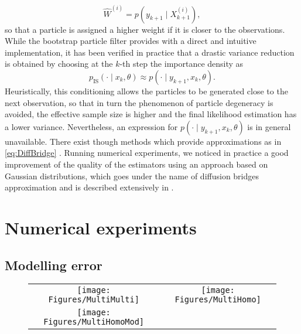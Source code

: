\documentclass[10pt]{article}
\begin{document}
\begin{equation}
	\widehat W^{(i)} = p(y_{k+1} \mid X^{(i)}_{k+1}),
\end{equation}
so that a particle is assigned a higher weight if it is closer to the observations. While the bootstrap particle filter provides with a direct and intuitive implementation, it has been verified in practice that a drastic variance reduction is obtained by choosing at the $k$-th step the importance density as
\begin{equation}\label{eq:DiffBridge}
	p_{\mathrm{IS}}(\cdot \mid x_k, \theta) \approx p(\cdot \mid y_{k+1}, x_k, \theta).
\end{equation}
Heuristically, this conditioning allows the particles to be generated close to the next observation, so that in turn the phenomenon of particle degeneracy is avoided, the effective sample size is higher and the final likelihood estimation has a lower variance. Nevertheless, an expression for $p(\cdot \mid y_{k+1}, x_k, \theta)$ is in general unavailable. There exist though methods which provide approximations as in \eqref{eq:DiffBridge} \cite{GoW10, GoW11}. Running numerical experiments, we noticed in practice a good improvement of the quality of the estimators using an approach based on Gaussian distributions, which goes under the name of diffusion bridges approximation and is described extensively in \cite{GoW11}.


\section{Numerical experiments}

\subsection{Modelling error}

\begin{figure}[t]
	\centering
	\begin{tabular}{cc}
		\texttt{[image: Figures/MultiMulti]} & \texttt{[image: Figures/MultiHomo]} \\
		\texttt{[image: Figures/MultiHomoMod]} & 
	\end{tabular}
\end{figure}
\end{document}
